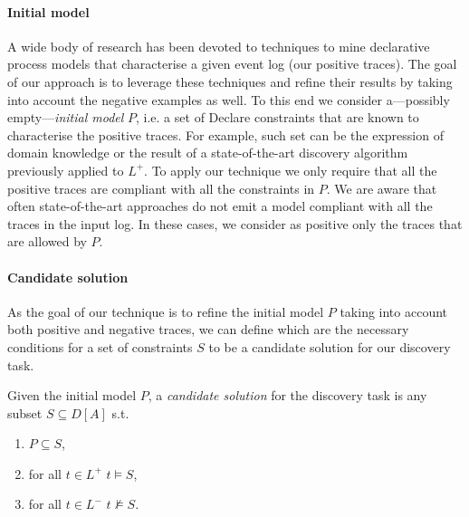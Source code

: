 \paragraph{Initial model} A wide body of research has been devoted to techniques to mine declarative process models that characterise a given event log (our positive traces). The goal of our approach is to leverage these techniques and refine their results by taking into account the negative examples as well. To this end we consider a---possibly empty---\emph{initial model} $P$, i.e. a set of Declare constraints that are known to characterise the positive traces. For example, such set can be the expression of domain knowledge or the result of a state-of-the-art discovery algorithm previously applied to $L^+$. To apply our technique we only require that all the positive traces are compliant with all the constraints in $P$. 
We are aware that often state-of-the-art approaches do not emit a model compliant with all the traces in the input log. In these cases, we consider as positive only the traces that are allowed by $P$.

\paragraph{Candidate solution} As the goal of our technique is to refine the initial model $P$ taking into account both positive and negative traces, we can define which are the necessary conditions for a set of constraints $S$ to be a candidate solution for our discovery task.

\theoremstyle{definition}\label{def:candidate}
\begin{definition}{}\label{def:cand}
Given the initial model $P$, a \emph{candidate solution} for the discovery task is any subset $S\subseteq D[A]$ s.t.
\begin{enumerate} [label=\textit{(\roman*)}]
  \item $P\subseteq S$,
  \item for all $t\in L^+$ $t\models S$, 
  \item for all $t\in L^-$ $t\not\models S$.
\end{enumerate}
\end{definition}

